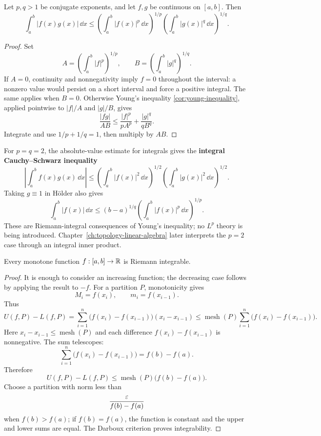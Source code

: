 \begin{theorem}
\label{thm:integral-holder}
Let \(p,q>1\) be conjugate exponents, and let \(f,g\) be continuous on
\([a,b]\). Then
\[
\boxed{
\int_a^b|f(x)g(x)|\,\dd x
\leq
\left(\int_a^b|f(x)|^p\,\dd x\right)^{1/p}
\left(\int_a^b|g(x)|^q\,\dd x\right)^{1/q}.}
\]
\end{theorem}
\begin{proof}
Set
\[
A=\left(\int_a^b|f|^p\right)^{1/p},
\qquad
B=\left(\int_a^b|g|^q\right)^{1/q}.
\]
If \(A=0\), continuity and nonnegativity imply \(f=0\) throughout the
interval: a nonzero value would persist on a short interval and force a
positive integral. The same applies when \(B=0\). Otherwise Young's inequality
\cref{cor:young-inequality}, applied pointwise to \(|f|/A\) and \(|g|/B\),
gives
\[
\frac{|fg|}{AB}
\leq\frac{|f|^p}{pA^p}+\frac{|g|^q}{qB^q}.
\]
Integrate and use \(1/p+1/q=1\), then multiply by \(AB\).
\end{proof}

For \(p=q=2\), the absolute-value estimate for integrals gives the
\textbf{integral Cauchy--Schwarz inequality}
\[
\boxed{
\left|\int_a^b f(x)g(x)\,\dd x\right|
\leq
\left(\int_a^b|f(x)|^2\,\dd x\right)^{1/2}
\left(\int_a^b|g(x)|^2\,\dd x\right)^{1/2}.}
\]
Taking \(g\equiv1\) in H\"older also gives
\[
\int_a^b|f(x)|\,\dd x
\leq(b-a)^{1/q}
\left(\int_a^b|f(x)|^p\,\dd x\right)^{1/p}.
\]
These are Riemann-integral consequences of Young's inequality; no
\(L^p\) theory is being introduced. Chapter~\ref{ch:topology-linear-algebra}
later interprets the \(p=2\) case through an integral inner product.

\begin{theorem}
\label{thm:monotone-riemann-integrable}
Every monotone function $f:[a,b]\to\mathbb{R}$ is Riemann integrable.
\end{theorem}
\begin{proof}
It is enough to consider an increasing function; the decreasing case follows by applying the result to $-f$. For a partition $P$, monotonicity gives
\[
M_i=f(x_i),
\qquad
m_i=f(x_{i-1}).
\]
Thus
\[
U(f,P)-L(f,P)
=\sum_{i=1}^{n}\bigl(f(x_i)-f(x_{i-1})\bigr)(x_i-x_{i-1})
\leq\operatorname{mesh}(P)\sum_{i=1}^{n}\bigl(f(x_i)-f(x_{i-1})\bigr).
\]
Here $x_i-x_{i-1}\leq\operatorname{mesh}(P)$ and each difference
$f(x_i)-f(x_{i-1})$ is nonnegative.  The sum telescopes:
\[
\sum_{i=1}^{n}\bigl(f(x_i)-f(x_{i-1})\bigr)=f(b)-f(a).
\]
Therefore
\[
U(f,P)-L(f,P)\leq\operatorname{mesh}(P)\bigl(f(b)-f(a)\bigr).
\]
Choose a partition with norm less than
\[
\frac{\varepsilon}{f(b)-f(a)}
\]
when $f(b)>f(a)$; if $f(b)=f(a)$, the function is constant and the upper and lower sums are equal. The Darboux criterion proves integrability.
\end{proof}

